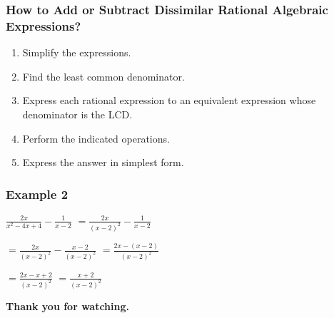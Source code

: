 \documentclass[14pt]{beamer}
\begin{document}
    \begin{frame}
    	\frametitle{How to Add or Subtract Dissimilar Rational Algebraic Expressions?}
    	\begin{enumerate}
    		\item Simplify the expressions.
    		\item Find the least common denominator. 
    		\item Express each rational expression to an equivalent expression whose denominator is the LCD.
    		\item Perform the indicated operations.
    		\item Express the answer in simplest form.
    	\end{enumerate}
    \end{frame}

    \begin{frame}
    	\frametitle{Example 2}
    	$\displaystyle \frac{2x}{x^2-4x+4} - \frac{1}{x-2}$
    	$ = \displaystyle \frac{2x}{(x - 2)^2} - \frac{1}{x-2} $
    	
    	\vspace{1em}\hspace{1em} $ = \displaystyle \frac{2x}{(x - 2)^2} - \frac{x - 2}{(x - 2)^2}$
    	$ = \displaystyle \frac{2x  -  (x - 2)}{ (x - 2)^2} $
    	
    	 \vspace{1em}\hspace{1em} $ = \displaystyle \frac{2x  - x  + 2}{ (x - 2)^2} $
    	 $ = \displaystyle \frac{ x  + 2}{ (x - 2)^2} $ \pause \redcheck
    \end{frame}
	
    \begin{frame}
    	\begin{center}
    		\textbf{\LARGE Thank you for watching.}
    	\end{center}
    \end{frame}
	
\end{document}

